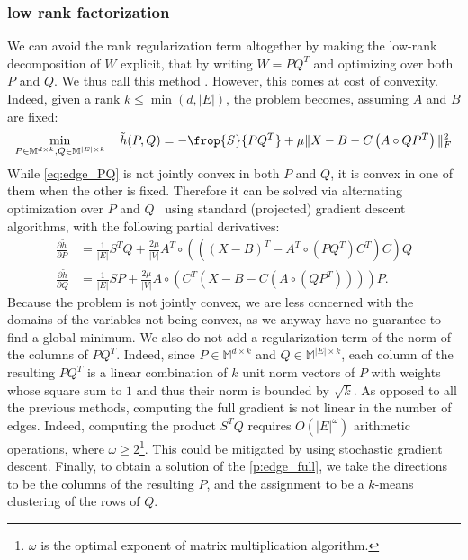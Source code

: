\subsubsection{\pqt{} low rank factorization}

We can avoid the rank regularization term altogether by making the low-rank decomposition of $W$
explicit, that by writing $W=PQ^T$ and optimizing over both $P$ and $Q$. We thus call this method
\pqt{}. However, this comes at cost
of convexity. Indeed, given a rank $k\leq \min(d,|E|)$, the problem becomes, assuming $A$ and $B$
are fixed:
\begin{equation}
  \label{eq:edge_PQ}
  \min_{P\in\mathbb{M}^{d\times k}, Q\in\mathbb{M}^{|E|\times k}} \quad \tilde{h}(P, Q) =
  - \frop{S}{PQ^T} + \mu \|X - B - C\left(A\circ QP^T \right)\|_F^2
\end{equation}
While \eqref{eq:edge_PQ} is not jointly convex in both $P$ and $Q$, it is convex in one of
them when the other is fixed. Therefore it can be solved via alternating optimization over $P$ and
$Q$~\autocite{AlternatingOptim02} using standard (projected) gradient descent algorithms, with the
following partial derivatives:
\begin{align*}
  \frac{\partial \tilde{h}}{\partial P} &=
  \frac{1}{|E|} S^T Q + \frac{2\mu}{|V|}
  A^T \circ (((X-B)^T -A^T \circ (PQ^T )C^T )C)Q 
  \\
  \frac{\partial \tilde{h}}{\partial Q} &=
  \frac{1}{|E|} S P + \frac{2\mu}{|V|}
  A\circ (C^T (X-B-C(A\circ (QP^T ))))P.
\end{align*}
Because the problem is not jointly convex, we are less concerned with the domains of the variables
not being convex, as we anyway have no guarantee to find a global minimum. We also do not add a
regularization term of the norm of the columns of $PQ^T$. Indeed, since $P\in\mathbb{M}^{d\times k}$
and $Q\in\mathbb{M}^{|E|\times k}$, each column of the resulting $PQ^T$ is a linear combination of
$k$ unit norm vectors of $P$ with weights whose square sum to $1$ and thus their norm is bounded by
$\sqrt{k}$. As opposed to all the previous methods, computing the full gradient is not linear in the
number of edges. Indeed, computing the product $S^T Q$ requires $O(|E|^\omega)$ arithmetic
operations, where $\omega \geq 2$\footnote{$\omega$ is the optimal exponent of matrix multiplication
algorithm.}. This could be mitigated by using stochastic gradient descent. Finally, to obtain a
solution of the \ecp{} \autoref{p:edge_full}, we take the directions to be the columns of the
resulting $P$, and the assignment to be a $k$-means clustering of the rows of $Q$.

